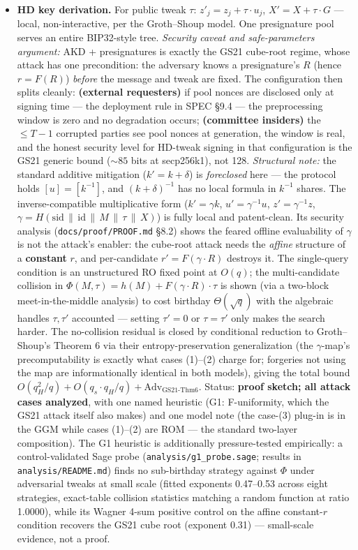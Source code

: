 \documentclass[11pt]{article}
\theoremstyle{plain}
\theoremstyle{definition}
\theoremstyle{remark}
\newcommand{\share}[1]{[#1]}
\newcommand{\sid}{\mathrm{sid}}
\begin{document}
\begin{itemize}[leftmargin=1.6em]
\item \textbf{HD key derivation.} For public tweak $\tau$: $z'_j = z_j + \tau \cdot u_j$, $X' = X + \tau \cdot G$ --- local, non-interactive, per the Groth--Shoup model. One presignature pool serves an entire BIP32-style tree. \emph{Security caveat and safe-parameters argument:} AKD + presignatures is exactly the GS21 cube-root regime, whose attack has one precondition: the adversary knows a presignature's $R$ (hence $r = F(R)$) \emph{before} the message and tweak are fixed. The configuration then splits cleanly: \textbf{(external requesters)} if pool nonces are disclosed only at signing time --- the deployment rule in SPEC \S9.4 --- the preprocessing window is zero and no degradation occurs; \textbf{(committee insiders)} the $\leq T{-}1$ corrupted parties see pool nonces at generation, the window is real, and the honest security level for HD-tweak signing in that configuration is the GS21 generic bound (${\sim}85$ bits at secp256k1), not 128. \emph{Structural note:} the standard additive mitigation ($k' = k + \delta$) is \emph{foreclosed} here --- the protocol holds $\share{u} = \share{k^{-1}}$, and $(k+\delta)^{-1}$ has no local formula in $k^{-1}$ shares. The inverse-compatible multiplicative form ($k' = \gamma k$, $u' = \gamma^{-1} u$, $z' = \gamma^{-1} z$, $\gamma = H(\sid \,\|\, \mathrm{id} \,\|\, M \,\|\, \tau \,\|\, X)$) is fully local and patent-clean. Its security analysis (\texttt{docs/proof/PROOF.md} \S8.2) shows the feared offline evaluability of $\gamma$ is not the attack's enabler: the cube-root attack needs the \emph{affine} structure of a \textbf{constant} $r$, and per-candidate $r' = F(\gamma \cdot R)$ destroys it. The single-query condition is an unstructured RO fixed point at $O(q)$; the multi-candidate collision in $\Phi(M, \tau) = h(M) + F(\gamma \cdot R)\cdot\tau$ is shown (via a two-block meet-in-the-middle analysis) to cost birthday $\Theta(\sqrt{q})$ with the algebraic handles $\tau, \tau'$ accounted --- setting $\tau' = 0$ or $\tau = \tau'$ only makes the search harder. The no-collision residual is closed by conditional reduction to Groth--Shoup's Theorem 6 via their entropy-preservation generalization (the $\gamma$-map's precomputability is exactly what cases (1)--(2) charge for; forgeries not using the map are informationally identical in both models), giving the total bound $O(q_H^2/q) + O(q_s \cdot q_H/q) + \mathrm{Adv}_{\mathrm{GS21\text{-}Thm6}}$. Status: \textbf{proof sketch; all attack cases analyzed}, with one named heuristic (G1: F-uniformity, which the GS21 attack itself also makes) and one model note (the case-(3) plug-in is in the GGM while cases (1)--(2) are ROM --- the standard two-layer composition). The G1 heuristic is additionally pressure-tested empirically: a control-validated Sage probe (\texttt{analysis/g1\_probe.sage}; results in \texttt{analysis/README.md}) finds no sub-birthday strategy against $\Phi$ under adversarial tweaks at small scale (fitted exponents 0.47--0.53 across eight strategies, exact-table collision statistics matching a random function at ratio 1.0000), while its Wagner 4-sum positive control on the affine constant-$r$ condition recovers the GS21 cube root (exponent 0.31) --- small-scale evidence, not a proof. 
\end{itemize}
\end{document}
